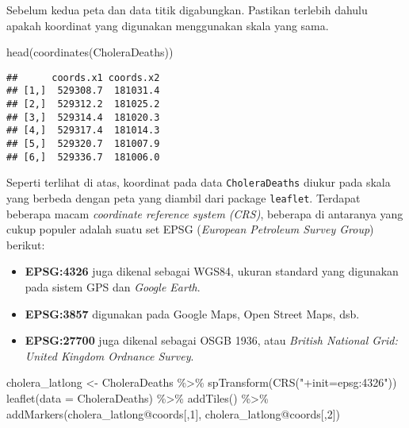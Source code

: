 \documentclass[
]{book}
\newenvironment{Shaded}{\begin{snugshade}}{\end{snugshade}}
\newcommand{\AttributeTok}[1]{\textcolor[rgb]{0.77,0.63,0.00}{#1}}
\newcommand{\DecValTok}[1]{\textcolor[rgb]{0.00,0.00,0.81}{#1}}
\newcommand{\FunctionTok}[1]{\textcolor[rgb]{0.00,0.00,0.00}{#1}}
\newcommand{\NormalTok}[1]{#1}
\newcommand{\OtherTok}[1]{\textcolor[rgb]{0.56,0.35,0.01}{#1}}
\newcommand{\SpecialCharTok}[1]{\textcolor[rgb]{0.00,0.00,0.00}{#1}}
\newcommand{\StringTok}[1]{\textcolor[rgb]{0.31,0.60,0.02}{#1}}
\begin{document}
Sebelum kedua peta dan data titik digabungkan. Pastikan terlebih dahulu apakah koordinat yang digunakan menggunakan skala yang sama.

\begin{Shaded}
\begin{Highlighting}[]
\FunctionTok{head}\NormalTok{(}\FunctionTok{coordinates}\NormalTok{(CholeraDeaths))}
\end{Highlighting}
\end{Shaded}

\begin{verbatim}
##      coords.x1 coords.x2
## [1,]  529308.7  181031.4
## [2,]  529312.2  181025.2
## [3,]  529314.4  181020.3
## [4,]  529317.4  181014.3
## [5,]  529320.7  181007.9
## [6,]  529336.7  181006.0
\end{verbatim}

Seperti terlihat di atas, koordinat pada data \texttt{CholeraDeaths} diukur pada skala yang berbeda dengan peta yang diambil dari package \texttt{leaflet}. Terdapat beberapa macam \emph{coordinate reference system (CRS)}, beberapa di antaranya yang cukup populer adalah suatu set EPSG (\emph{European Petroleum Survey Group}) berikut:

\begin{itemize}
\item
  \textbf{EPSG:4326} juga dikenal sebagai WGS84, ukuran standard yang digunakan pada sistem GPS dan \emph{Google Earth}.
\item
  \textbf{EPSG:3857} digunakan pada Google Maps, Open Street Maps, dsb.
\item
  \textbf{EPSG:27700} juga dikenal sebagai OSGB 1936, atau \emph{British National Grid: United Kingdom Ordnance Survey}.
\end{itemize}

\begin{Shaded}
\begin{Highlighting}[]
\NormalTok{cholera\_latlong }\OtherTok{\textless{}{-}}\NormalTok{ CholeraDeaths }\SpecialCharTok{\%\textgreater{}\%} 
  \FunctionTok{spTransform}\NormalTok{(}\FunctionTok{CRS}\NormalTok{(}\StringTok{"+init=epsg:4326"}\NormalTok{))}
\FunctionTok{leaflet}\NormalTok{(}\AttributeTok{data =}\NormalTok{ CholeraDeaths) }\SpecialCharTok{\%\textgreater{}\%} 
  \FunctionTok{addTiles}\NormalTok{() }\SpecialCharTok{\%\textgreater{}\%}
  \FunctionTok{addMarkers}\NormalTok{(cholera\_latlong}\SpecialCharTok{@}\NormalTok{coords[,}\DecValTok{1}\NormalTok{], cholera\_latlong}\SpecialCharTok{@}\NormalTok{coords[,}\DecValTok{2}\NormalTok{])}
\end{Highlighting}
\end{Shaded}
\end{document}
